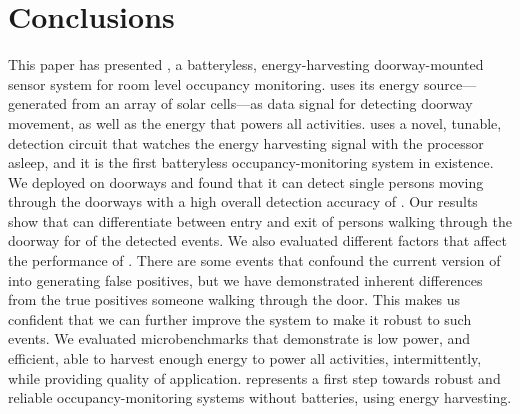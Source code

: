 \section{Conclusions}
\label{sec:conclusions}

This paper has presented \sysname, a batteryless, energy-harvesting doorway-mounted sensor system for room level occupancy monitoring.
\sysname uses its energy source---generated from an array of solar cells---as data signal for detecting doorway movement, as well as the energy that powers all activities.
\sysname uses a novel, tunable, detection circuit that watches the energy harvesting signal with the processor asleep, and it is the first batteryless occupancy-monitoring system in existence.
We deployed \sysname on \numDoors doorways and found that it can detect single persons moving through the doorways with a high overall detection accuracy of \SysAccuracy. Our results show that \sysname can differentiate between entry and exit of persons walking through the doorway for \dirAccuracy of the detected events.
We also evaluated different factors that affect the performance of \sysname.
There are some events that confound the current version of \sysname into generating false positives, but we have demonstrated inherent differences from the true positives \ie someone walking through the door.
This makes us confident that we can further improve the \sysname system to make it robust to such events.
We evaluated \sysname microbenchmarks that demonstrate \sysname is low power, and efficient, able to harvest enough energy to power all activities, intermittently, while providing quality of application.
\sysname represents a first step towards robust and reliable occupancy-monitoring systems without batteries, using energy harvesting.
